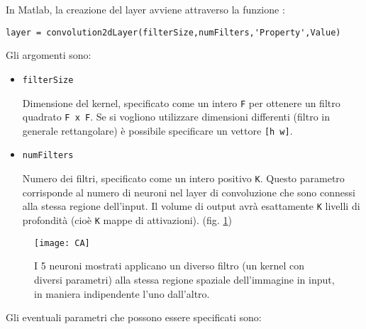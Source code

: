 In Matlab, la creazione del layer avviene attraverso la funzione \texttt{}:

\begin{verbatim}
layer = convolution2dLayer(filterSize,numFilters,'Property',Value)
\end{verbatim}

Gli argomenti sono:

\begin{itemize}
	\item \verb|filterSize|
	
	Dimensione del kernel, specificato come un intero \verb|F| per ottenere un filtro quadrato \verb|F x F|. Se si vogliono utilizzare dimensioni differenti (filtro in generale rettangolare) è possibile specificare un vettore \verb|[h w]|.
	
	\item \verb|numFilters|
	
	Numero dei filtri, specificato come un intero positivo \verb|K|. Questo parametro corrisponde al numero di neuroni nel layer di convoluzione che sono connessi alla stessa regione dell'input. Il volume di output avrà esattamente \verb|K| livelli di profondità (cioè \verb|K| mappe di attivazioni). (fig. \ref{fig:ca})
\end{itemize}

\begin{figure}[h]
	\centering
	\texttt{[image: CA]}
	\caption[Output di un Convolution Layer]{I 5 neuroni mostrati applicano un diverso filtro (un kernel con diversi parametri) alla stessa regione spaziale dell'immagine in input, in maniera indipendente l'uno dall'altro.}
	\label{fig:ca}
\end{figure}

Gli eventuali parametri che possono essere specificati sono:

